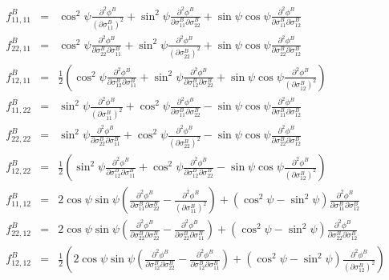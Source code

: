 \documentclass[12pt]{amsart}
\begin{document}
\begin{eqnarray}
  \label{eq:f2xb}
  f_{11,11}^B &=&            \cos^2\psi \frac{\partial^2 \phi^B}{(\partial \sigma^B_{11})^2}                   + \sin^2\psi\frac{\partial^2 \phi^B}{\partial\sigma^B_{11} \partial\sigma^B_{22}} + \sin\psi\cos\psi \frac{\partial^2 \phi^B}{\partial\sigma^B_{11} \partial\sigma^B_{12}}\\
  f_{22,11}^B &=&            \cos^2\psi \frac{\partial^2 \phi^B}{\partial \sigma^B_{22}\partial \sigma^B_{11}} + \sin^2\psi\frac{\partial^2 \phi^B}{(\partial\sigma^B_{22})^2}                   + \sin\psi\cos\psi \frac{\partial^2 \phi^B}{\partial\sigma^B_{22} \partial\sigma^B_{12}}\nonumber\\
  f_{12,11}^B &=&\frac{1}{2} (\cos^2\psi \frac{\partial^2 \phi^B}{\partial \sigma^B_{12}\partial \sigma^B_{11}} + \sin^2\psi\frac{\partial^2 \phi^B}{\partial\sigma^B_{12} \partial\sigma^B_{22}} + \sin\psi\cos\psi \frac{\partial^2 \phi^B}{(\partial\sigma^B_{12})^2})\nonumber\\
  f_{11,22}^B &=&            \sin^2\psi \frac{\partial^2 \phi^B}{(\partial \sigma^B_{11})^2}                   + \cos^2\psi\frac{\partial^2 \phi^B}{\partial\sigma^B_{11} \partial\sigma^B_{22}} - \sin\psi\cos\psi \frac{\partial^2 \phi^B}{\partial\sigma^B_{11} \partial\sigma^B_{12}}\nonumber\\
  f_{22,22}^B &=&            \sin^2\psi \frac{\partial^2 \phi^B}{\partial \sigma^B_{22}\partial \sigma^B_{11}} + \cos^2\psi\frac{\partial^2 \phi^B}{(\partial\sigma^B_{22})^2}                   - \sin\psi\cos\psi \frac{\partial^2 \phi^B}{\partial\sigma^B_{22} \partial\sigma^B_{12}}\nonumber\\
  f_{12,22}^B &=&\frac{1}{2} (\sin^2\psi \frac{\partial^2 \phi^B}{\partial \sigma^B_{12}\partial \sigma^B_{11}} + \cos^2\psi\frac{\partial^2 \phi^B}{\partial\sigma^B_{12} \partial\sigma^B_{22}} - \sin\psi\cos\psi \frac{\partial^2 \phi^B}{(\partial\sigma^B_{12})^2})\nonumber\\
  f_{11,12}^B &=& 2\cos\psi\sin\psi(\frac{\partial^2 \phi^B}{\partial \sigma^B_{11}\partial \sigma^B_{22}}-\frac{\partial^2 \phi^B}{(\partial \sigma^B_{11})^2})+(\cos^2\psi-\sin^2\psi)\frac{\partial^2 \phi^B}{\partial \sigma^B_{11}\partial \sigma^B_{12}}\nonumber\\
  f_{22,12}^B &=& 2\cos\psi\sin\psi(\frac{\partial^2 \phi^B}{\partial \sigma^B_{22}\partial \sigma^B_{22}}-\frac{\partial^2 \phi^B}{\partial \sigma^B_{22}\partial \sigma^B_{11}})+(\cos^2\psi-\sin^2\psi)\frac{\partial^2 \phi^B}{\partial \sigma^B_{22}\partial \sigma^B_{12}}\nonumber\\
  f_{12,12}^B &=& \frac{1}{2}(2\cos\psi\sin\psi(\frac{\partial^2 \phi^B}{\partial \sigma^B_{12}\partial \sigma^B_{22}}-\frac{\partial^2 \phi^B}{\partial \sigma^B_{12}\partial \sigma^B_{11}})+(\cos^2\psi-\sin^2\psi)\frac{\partial^2 \phi^B}{(\partial \sigma^B_{12})^2})\nonumber
\end{eqnarray}
\end{document}
